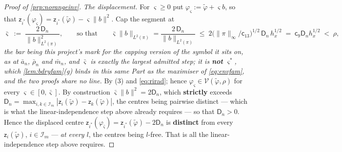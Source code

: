 \begin{proof}[Proof of \cref{prp:norangeinv}]
\emph{The displacement.} For $\varsigma\ge0$ put $\varphi_\varsigma:=\tilde\varphi+\varsigma b$, so that
$\mathsf z_{i^\ast}(\varphi_\varsigma)=\mathsf z_{i^\ast}(\tilde\varphi)-\varsigma\|b\|^{2}$. Cap the
segment at
\[
\bar\varsigma\;:=\;\frac{2\,\mathsf D_n}{\|b\|^{2}_{L^{2}(\pi)}} ,
\qquad\text{so that}\qquad
\bar\varsigma\|b\|_{L^{2}(\pi)}=\frac{2\,\mathsf D_n}{\|b\|_{L^{2}(\pi)}}
\;\le\;2\big(\|\pi\|_\infty/\mathsf c_{13}\big)^{1/2}\,\mathsf D_n\,h_x^{1/2}\;=\;\mathsf c_9\mathsf D_n h_x^{1/2}\;<\;\rho ,
\]
\emph{the bar being this project's mark for the capping version of the symbol it sits on, as at
$\bar a_n$, $\bar\rho_n$ and $\bar m_n$, and $\bar\varsigma$ is exactly the largest admitted step; it is
\textbf{not} $\varsigma^\ast$, which \cref{lem:bdryfam}\textup{(g)} binds in this same Part as the
maximiser of \eqref{eq:envfam}, and the two proofs share no line.}
By (3) and \eqref{eq:rirad}; hence $\varphi_\varsigma\in\mathcal V(\tilde\varphi,\rho)$ for every
$\varsigma\in[0,\bar\varsigma]$. By construction $\bar\varsigma\|b\|^{2}=2\mathsf D_n$, which
\textbf{strictly} exceeds
$\mathsf D_n=\max_{i,k\in\mathcal I_m}|\mathsf z_i(\tilde\varphi)-\mathsf z_k(\tilde\varphi)|$, the
centres being pairwise distinct --- which is what the linear-independence step above already
requires --- so that $\mathsf D_n>0$. Hence the displaced centre
$\mathsf z_{i^\ast}(\varphi_{\bar\varsigma})=\mathsf z_{i^\ast}(\tilde\varphi)-2\mathsf D_n$ is
\textbf{distinct} from every $\mathsf z_i(\tilde\varphi)$, $i\in\mathcal I_m$ --- \emph{at every $l$},
the centres being $l$-free. That is all the linear-independence step above requires.


\end{proof}
